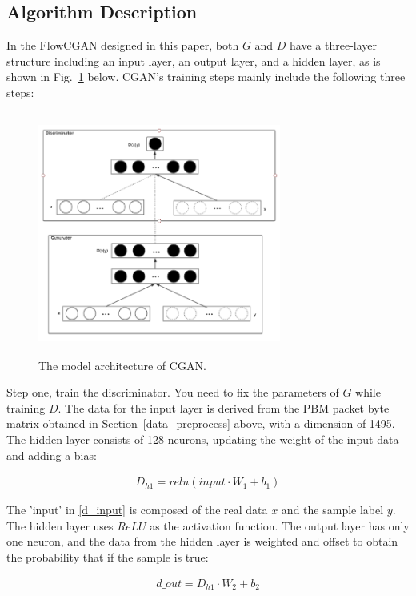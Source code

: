 \documentclass[conference]{IEEEtran}
\begin{document}
\subsection{Algorithm Description}\label{algorithm_escription}
In the FlowCGAN designed in this paper, both $G$ and $D$ have a three-layer structure including an input layer, an output layer, and a hidden layer, as is shown in Fig.~\ref{cgan_model} below. CGAN's training steps mainly include the following three steps:

\begin{figure}[htbp]
\centerline{\includegraphics[width=8cm, height=8cm]{fig/cgan_model.png}}
\caption{The model architecture of CGAN.}
\label{cgan_model}
\end{figure}


Step one, train the discriminator. You need to fix the parameters of $G$ while training $D$. The data for the input layer is derived from the PBM packet byte matrix obtained in Section~\ref{data_preprocess} above, with a dimension of 1495. The hidden layer consists of 128 neurons, updating the weight of the input data and adding a bias:

\begin{equation}
\begin{split}
\label{d_input}
 D_{h1}=relu(input\cdot W_1+b_1)
\end{split}
\end{equation}

The 'input' in  \eqref{d_input} is composed of the real data $x$ and the sample label $y$. The hidden layer uses $ReLU$ as the activation function. The output layer has only one neuron, and the data from the hidden layer is weighted and offset to obtain the probability that if the sample is true:

\begin{equation}
\begin{split}
\label{d_output}
 d\_out=D_{h1}\cdot W_2+b_2
\end{split}
\end{equation}
\end{document}
